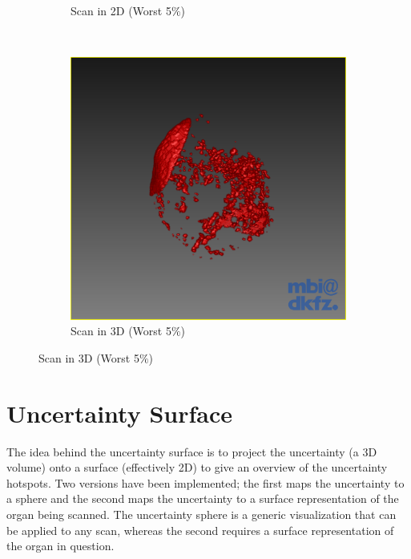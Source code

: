 \begin{figure}[H]
\begin{subfigure}[b]{0.5\textwidth}
    \caption{Scan in 2D (Worst 5$\%$)}
    \label{fig:thresholdingresultsscan2d}
  \end{subfigure}%
  ~ %
  \begin{subfigure}[b]{0.5\textwidth}
    \includegraphics[width=\textwidth]{images/thresholding/results/scan_3d.png}
    \caption{Scan in 3D (Worst 5$\%$)}
    \label{fig:thresholdingresultsscan3d}
  \end{subfigure}
\end{figure}

\newpage
\section{Uncertainty Surface}\label{section:uncertaintysurface}
The idea behind the uncertainty surface is to project the uncertainty (a 3D volume) onto a surface (effectively 2D) to give an overview of the uncertainty hotspots. Two versions have been implemented; the first maps the uncertainty to a sphere and the second maps the uncertainty to a surface representation of the organ being scanned. The uncertainty sphere is a generic visualization that can be applied to any scan, whereas the second requires a surface representation of the organ in question.

